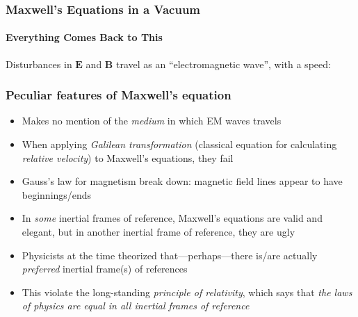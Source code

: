 \documentclass[12pt,compress,aspectratio=169]{beamer}
\newcommand{\mb}[1]{\mathbf{#1}}
\begin{document}
\begin{frame}
  \frametitle{Maxwell's Equations in a Vacuum}
  \framesubtitle{Everything Comes Back to This}

  \vspace{-.3in}{\Large
    \begin{align*}
      \nabla\cdot\mb{E} &= 0\\
      \nabla\cdot\mb{B} &= 0\\
      \nabla\times\mb{E} &=-\frac{\partial\mb{B}}{\partial t}\\
      \nabla\times\mb{B} &=\mu_o\varepsilon_o\frac{\partial\mb{E}}{\partial t}
    \end{align*}
  }
  
  \vspace{-.15in}Disturbances in $\mb{E}$ and $\mb{B}$ travel as an
  ``electromagnetic wave'', with a speed:

\end{frame}


\begin{frame}
  \frametitle{Peculiar features of Maxwell's equation}
  \begin{itemize}
  \item Makes no mention of the \emph{medium} in which EM waves travels
  \item When applying \emph{Galilean transformation} (classical equation for
    calculating \emph{relative velocity}) to Maxwell's equations, they fail
  \item Gauss's law for magnetism break down: magnetic field lines appear to
    have beginnings/ends
  \item In \emph{some} inertial frames of reference,
    Maxwell's equations are valid and elegant, but in another inertial frame
    of reference, they are ugly
  \item Physicists at the time theorized that---perhaps---there is/are actually
    \emph{preferred} inertial frame(s) of references
  \item This violate the long-standing
    \emph{principle of relativity}, which says that
    \emph{the laws of physics are equal in all inertial frames of reference}
  \end{itemize}
\end{frame}
\end{document}
